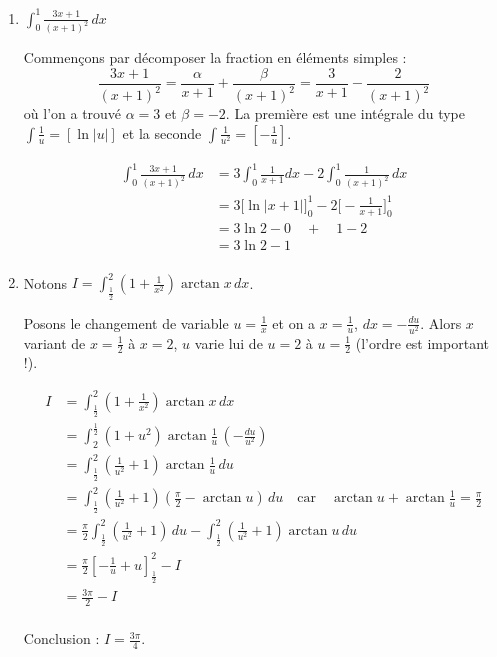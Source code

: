 \documentclass[11pt,a4paper]{article}
\begin{document}
\begin{enumerate}
  \item $\int_0^1\frac{3x+1}{\left( x+1\right) ^2} \,  dx$

Commençons par décomposer la fraction en éléments simples :
$$\frac{3x+1}{\left( x+1\right) ^2} = \frac{\alpha}{x+1}+\frac{\beta}{(x+1)^2}
= \frac{3}{x+1}-\frac{2}{(x+1)^2}$$
où l'on a trouvé $\alpha=3$ et $\beta=-2$.
La première est une intégrale du type $\int \frac 1u = [\ln |u|]$ et la seconde
$\int \frac 1{u^2} = [ -\frac 1u ]$.

\begin{align*}
\int_0^1\frac{3x+1}{\left( x+1\right) ^2} \,  dx
  &=   3 \int_0^1 \frac{1}{x+1} dx   - 2 \int_0^1 \frac{1}{(x+1)^2} \, dx \\
  &= 3 \Big[ \ln|x+1| \Big]_0^1  - 2 \Big[ - \frac{1}{x+1} \Big]_0^1 \\
  &= 3 \ln 2 - 0 \quad + \quad 1 - 2 \\
  &= 3 \ln 2 - 1 \\
\end{align*}


  \item Notons $I = \int_{\frac 12}^2\left( 1+\frac 1{x^2}\right) \arctan x \, dx$.

Posons le changement de variable $u=\frac 1x$ et 
on a $x=\frac 1u$, $dx = -\frac{du}{u^2}$.
Alors $x$ variant de $x=\frac 12$ à $x=2$,
$u$ varie lui de $u=2$ à $u=\frac 12$ (l'ordre est important !).

\begin{align*}
I &= \int_{\frac 12}^2\left( 1+\frac 1{x^2}\right) \arctan x \, dx  \\
  &= \int_2^{\frac 12}\left( 1+u^2 \right) \arctan \frac 1u  \, \left(-\frac{du}{u^2}\right)  \\
  &= \int_{\frac 12}^2 \left( \frac1{u^2} + 1\right) \arctan \frac 1u  \, du  \\
  &= \int_{\frac 12}^2 \left( \frac1{u^2} + 1\right) \left( \frac \pi 2 - \arctan u \right)   \, du  \quad \text{car} \quad \arctan u+\arctan \frac1u=\frac\pi2\\
  &= \frac \pi 2\int_{\frac 12}^2 \left( \frac1{u^2} + 1 \right)\, du  -  \int_{\frac 12}^2  \left( \frac1{u^2} + 1\right)\arctan u  \, du  \\  
  &= \frac \pi 2 \left[ -\frac1{u} + u\right]_{\frac 12}^2  -  I \\  
  &= \frac{3\pi}{2} - I\\
\end{align*}

Conclusion : $I = \frac{3\pi}{4}.$
\end{enumerate}
\end{document}
